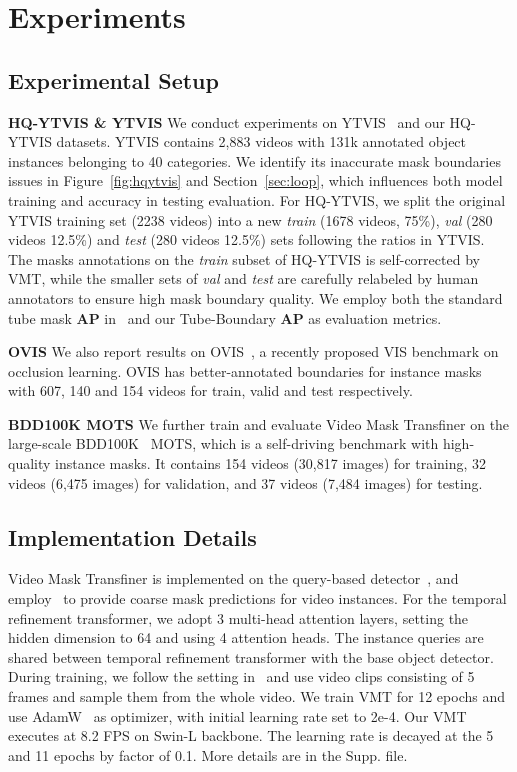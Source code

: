 \documentclass[runningheads]{llncs}
\newcommand{\parsection}[1]{\textbf{#1} }
\begin{document}
\section{Experiments}


\subsection{Experimental Setup}


\parsection{HQ-YTVIS \& YTVIS}
We conduct experiments on YTVIS~\cite{yang2019video} and our HQ-YTVIS datasets. YTVIS contains 2,883 videos with 131k annotated object instances belonging to 40 categories. We identify its inaccurate mask boundaries issues in Figure~\ref{fig:hqytvis} and Section~\ref{sec:loop}, which influences both model training and accuracy in testing evaluation.
For HQ-YTVIS, we split the original YTVIS training set (2238 videos) into a new \emph{train} (1678 videos, 75\%), \emph{val} (280 videos 12.5\%) and \emph{test} (280 videos 12.5\%) sets following the ratios in YTVIS. The masks annotations on the \emph{train} subset of HQ-YTVIS is self-corrected by VMT, while the smaller sets of \emph{val} and \emph{test} are carefully relabeled by human annotators to ensure high mask boundary quality. We employ both the standard tube mask \textbf{AP} in~\cite{yang2019video} and our Tube-Boundary \textbf{AP} as evaluation metrics. 



\parsection{OVIS} 
We also report results on OVIS~\cite{qi2021occluded}, a recently proposed VIS benchmark on occlusion learning. OVIS has better-annotated boundaries for instance masks with 607, 140 and 154 videos for train, valid and test respectively. 

\parsection{BDD100K MOTS}
We further train and evaluate Video Mask Transfiner on the large-scale BDD100K~\cite{bdd100k} MOTS, which is a self-driving benchmark with high-quality instance masks. It contains 154 videos (30,817 images) for training, 32 videos (6,475 images) for validation, and 37 videos (7,484 images) for testing. 



\subsection{Implementation Details}
Video Mask Transfiner is implemented on the query-based detector~\cite{zhu2020deformable}, and employ~\cite{wu2021seqformer} to provide coarse mask predictions for video instances.
For the temporal refinement transformer, we adopt 3 multi-head attention layers, setting the hidden dimension to 64 and using 4 attention heads. The instance queries are shared between temporal refinement transformer with the base object detector.
During training, we follow the setting in~\cite{wu2021seqformer} and use video clips consisting of 5 frames and sample them from the whole video. We train VMT for 12 epochs and use AdamW~\cite{admw} as optimizer, with initial learning rate set to 2e-4. Our VMT executes at 8.2 FPS on Swin-L backbone. The learning rate is decayed at the 5 and 11 epochs by factor of 0.1. More details are in the Supp. file.
\end{document}
